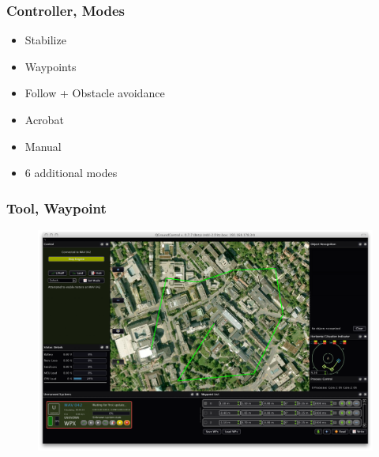 \begin{frame}
\frametitle{Controller, Modes}

  \begin{itemize}
    \item Stabilize    
    \item Waypoints   
	\item Follow + Obstacle avoidance
	\item Acrobat 	
	\item Manual 	
	\item 6 additional modes 
  \end{itemize}
  
\end{frame}



\begin{frame}
\frametitle{Tool, Waypoint}

  \begin{figure}
  \includegraphics[scale=0.2]{pic/03_our-copter/qgroundcontrol.png}
  \end{figure}
  
\end{frame}



